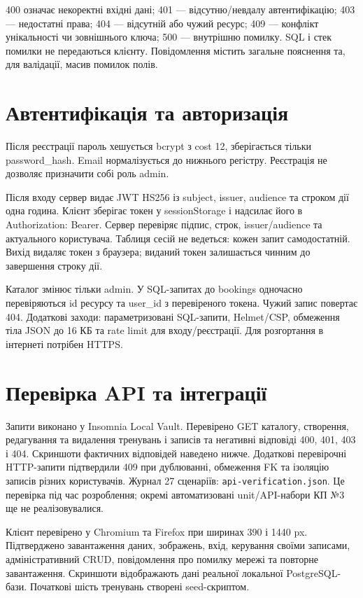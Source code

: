 \documentclass[12pt,a4paper]{article}
\newcommand{\file}[1]{\texttt{#1}}
\begin{document}
400 означає некоректні вхідні дані; 401 --- відсутню/невдалу автентифікацію; 403 --- недостатні права; 404 --- відсутній або чужий ресурс; 409 --- конфлікт унікальності чи зовнішнього ключа; 500 --- внутрішню помилку. SQL і стек помилки не передаються клієнту. Повідомлення містить загальне пояснення та, для валідації, масив помилок полів.

\section{Автентифікація та авторизація}
Після реєстрації пароль хешується bcrypt з cost 12, зберігається тільки password\_hash. Email нормалізується до нижнього регістру. Реєстрація не дозволяє призначити собі роль admin.

Після входу сервер видає JWT HS256 із subject, issuer, audience та строком дії одна година. Клієнт зберігає токен у sessionStorage і надсилає його в Authorization: Bearer. Сервер перевіряє підпис, строк, issuer/audience та актуального користувача. Таблиця сесій не ведеться: кожен запит самодостатній. Вихід видаляє токен з браузера; виданий токен залишається чинним до завершення строку дії.

Каталог змінює тільки admin. У SQL-запитах до bookings одночасно перевіряються id ресурсу та user\_id з перевіреного токена. Чужий запис повертає 404. Додаткові заходи: параметризовані SQL-запити, Helmet/CSP, обмеження тіла JSON до 16 КБ та rate limit для входу/реєстрації. Для розгортання в інтернеті потрібен HTTPS.

\section{Перевірка API та інтеграції}
Запити виконано у Insomnia Local Vault. Перевірено GET каталогу, створення, редагування та видалення тренувань і записів та негативні відповіді 400, 401, 403 і 404. Скриншоти фактичних відповідей наведено нижче. Додаткові перевірочні HTTP-запити підтвердили 409 при дублюванні, обмеження FK та ізоляцію записів різних користувачів. Журнал 27 сценаріїв: \file{api-verification.json}. Це перевірка під час розроблення; окремі автоматизовані unit/API-набори КП №3 ще не реалізовувалися.

Клієнт перевірено у Chromium та Firefox при ширинах 390 і 1440 px. Підтверджено завантаження даних, зображень, вхід, керування своїми записами, адміністративний CRUD, повідомлення про помилку мережі та повторне завантаження. Скриншоти відображають дані реальної локальної PostgreSQL-бази. Початкові шість тренувань створені seed-скриптом.
\end{document}
